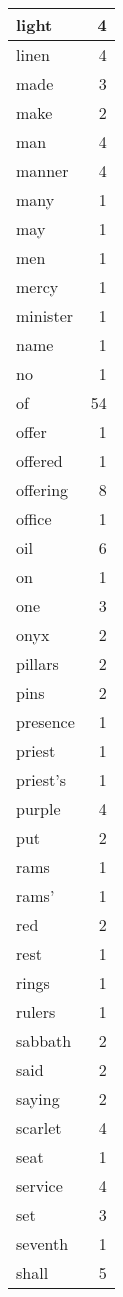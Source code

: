 \begin{center}
\begin{longtable}{l|r}
light & 4 \\ \hline
linen & 4 \\ \hline
made & 3 \\ \hline
make & 2 \\ \hline
man & 4 \\ \hline
manner & 4 \\ \hline
many & 1 \\ \hline
may & 1 \\ \hline
men & 1 \\ \hline
mercy & 1 \\ \hline
minister & 1 \\ \hline
name & 1 \\ \hline
no & 1 \\ \hline
of & 54 \\ \hline
offer & 1 \\ \hline
offered & 1 \\ \hline
offering & 8 \\ \hline
office & 1 \\ \hline
oil & 6 \\ \hline
on & 1 \\ \hline
one & 3 \\ \hline
onyx & 2 \\ \hline
pillars & 2 \\ \hline
pins & 2 \\ \hline
presence & 1 \\ \hline
priest & 1 \\ \hline
priest's & 1 \\ \hline
purple & 4 \\ \hline
put & 2 \\ \hline
rams & 1 \\ \hline
rams' & 1 \\ \hline
red & 2 \\ \hline
rest & 1 \\ \hline
rings & 1 \\ \hline
rulers & 1 \\ \hline
sabbath & 2 \\ \hline
said & 2 \\ \hline
saying & 2 \\ \hline
scarlet & 4 \\ \hline
seat & 1 \\ \hline
service & 4 \\ \hline
set & 3 \\ \hline
seventh & 1 \\ \hline
shall & 5 \\ \hline

\end{longtable}
\end{center}
